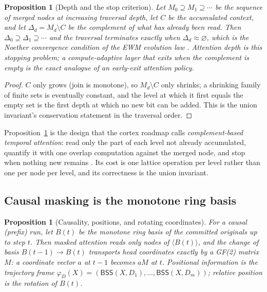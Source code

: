 \documentclass[11pt,a4paper]{article}
\newtheorem{proposition}[principle]{Proposition}
\theoremstyle{remark}
\newcommand{\BSS}{\ensuremath{\mathsf{BSS}}}           %
\newcommand{\spanof}[1]{\ensuremath{\langle #1\rangle}}%
\begin{document}
\begin{proposition}[Depth and the stop criterion]
\label{prop:depth}
Let $M_0\supseteq M_1\supseteq\cdots$ be the sequence of merged nodes at
increasing traversal depth, let $C$ be the accumulated context, and let
$\Delta_d=M_d\setminus C$ be the complement of what has already been read.
Then $\Delta_0\supseteq\Delta_1\supseteq\cdots$ and the traversal terminates
exactly when $\Delta_d\approx\varnothing$, which is the Noether convergence
condition of the EWM evolution law \cite{ewm2026}. Attention depth is this
stopping problem; a compute-adaptive layer that exits when the complement is
empty is the exact analogue of an early-exit attention policy.
\end{proposition}

\begin{proof}
$C$ only grows (join is monotone), so $M_d\setminus C$ only shrinks; a shrinking
family of finite sets is eventually constant, and the level at which it first
equals the empty set is the first depth at which no new bit can be added. This
is the union invariant's conservation statement in the traversal order.
\end{proof}

Proposition~\ref{prop:depth} is the design that the cortex roadmap calls
\emph{complement-based temporal attention}: read only the part of each level not
already accumulated, quantify it with one overlap computation against the merged
node, and stop when nothing new remains \cite{roadmap2026}. Its cost is one
lattice operation per level rather than one per node per level, and its
correctness is the union invariant.

\subsection{Causal masking is the monotone ring basis}

\begin{proposition}[Causality, positions, and rotating coordinates]
\label{prop:causal}
For a causal (prefix) run, let $B(t)$ be the monotone ring basis of the
committed originals up to step $t$. Then masked attention reads only nodes of
$\spanof{B(t)}$, and the change of basis $B(t{-}1)\to B(t)$ transports head
coordinates exactly by a GF(2) matrix $M$: a coordinate vector $a$ at $t{-}1$
becomes $aM$ at $t$. Positional information is the trajectory frame
$\varphi_D(X)=(\BSS(X,D_1),\dots,\BSS(X,D_m))$; relative position is the
rotation of $B(t)$.
\end{proposition}
\end{document}
